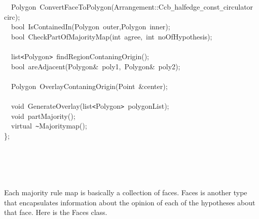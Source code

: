 {\jttstylea ~~\jttstylek Polygon~ConvertFaceToPolygon\jttstylei (\jttstylek Arrangement::Ccb\verb#_#halfedge\verb#_#const\verb#_#circulator~circ\jttstylei )\jttstylek ;\\
\jttstylea ~~\jttstylek bool~IsContainedIn\jttstylei (\jttstylek Polygon~outer,Polygon~inner\jttstylei )\jttstylek ;\\
\jttstylea ~~\jttstylek bool~CheckPartOfMajorityMap\jttstylei (\jttstylej int~\jttstylek agree,~\jttstylej int~\jttstylek noOfHypothesis\jttstylei )\jttstylek ;\\
\jttstylea \\
\jttstylea ~~\jttstylek list\verb#<#Polygon\verb#>#~findRegionContaningOrigin\jttstylei ()\jttstylek ;\\
\jttstylea ~~\jttstylek bool~areAdjacent\jttstylei (\jttstylek Polygon\&~poly1,~Polygon\&~poly2\jttstylei )\jttstylek ;\\
\jttstylea \\
\jttstylea ~~\jttstylek Polygon~OverlayContaningOrigin\jttstylei (\jttstylek Point~\&center\jttstylei )\jttstylek ;\\
\jttstylea \\
\jttstylea ~~\jttstylej void~\jttstylek GenerateOverlay\jttstylei (\jttstylek list\verb#<#Polygon\verb#>#~polygonList\jttstylei )\jttstylek ;\\
\jttstylea ~~\jttstylej void~\jttstylek partMajority\jttstylei ()\jttstylek ;\\
\jttstylea ~~\jttstylek virtual~\verb#~#Majoritymap\jttstylei ()\jttstylek ;\\
\jttstylei \}\jttstylek ;\\
\jttstylea \\
\jttstylea \\
\jttstylea \\
\jttstylea \jttstylea 
\\

}

Each majority rule map is basically a collection of faces. Faces is another type that encapsulates information about the opinion of 
each of the hypotheses about that face. Here is the Faces class.

